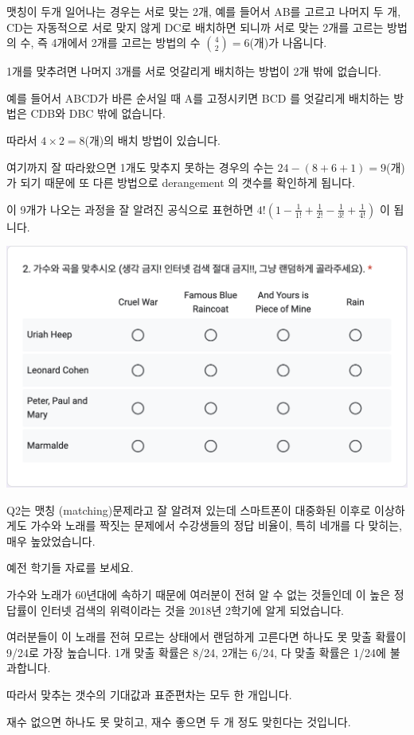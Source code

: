 \documentclass[
]{book}
\begin{document}
맷칭이 두개 일어나는 경우는 서로 맞는 2개, 예를 들어서 AB를 고르고 나머지 두 개, CD는 자동적으로 서로 맞지 않게 DC로 배치하면 되니까 서로 맞는 2개를 고르는 방법의 수, 즉 4개에서 2개를 고르는 방법의 수 \(\binom{4}{2} = 6\)(개)가 나옵니다.

1개를 맞추려면 나머지 3개를 서로 엇갈리게 배치하는 방법이 2개 밖에 없습니다.

예를 들어서 ABCD가 바른 순서일 때 A를 고정시키면 BCD 를 엇갈리게 배치하는 방법은 CDB와 DBC 밖에 없습니다.

따라서 \(4\times2 = 8\)(개)의 배치 방법이 있습니다.

여기까지 잘 따라왔으면 1개도 맞추지 못하는 경우의 수는 \(24 - (8 + 6 + 1) = 9\)(개)가 되기 때문에 또 다른 방법으로 derangement 의 갯수를 확인하게 됩니다.

이 9개가 나오는 과정을 잘 알려진 공식으로 표현하면 \(4! \left( 1 - \frac{1}{1!} + \frac{1}{2!} - \frac{1}{3!} + \frac{1}{4!} \right)\) 이 됩니다.

\includegraphics[width=0.75\linewidth]{./pics/Quiz240524_Q2}

Q2는 맷칭 (matching)문제라고 잘 알려져 있는데 스마트폰이 대중화된 이후로 이상하게도 가수와 노래를 짝짓는 문제에서 수강생들의 정답 비율이, 특히 네개를 다 맞히는, 매우 높았었습니다.

예전 학기들 자료를 보세요.

가수와 노래가 60년대에 속하기 때문에 여러분이 전혀 알 수 없는 것들인데 이 높은 정답률이 인터넷 검색의 위력이라는 것을 2018년 2학기에 알게 되었습니다.

여러분들이 이 노래를 전혀 모르는 상태에서 랜덤하게 고른다면 하나도 못 맞출 확률이 9/24로 가장 높습니다.
1개 맞출 확률은 8/24, 2개는 6/24, 다 맞출 확률은 1/24에 불과합니다.

따라서 맞추는 갯수의 기대값과 표준편차는 모두 한 개입니다.

재수 없으면 하나도 못 맞히고, 재수 좋으면 두 개 정도 맞힌다는 것입니다.
\end{document}
